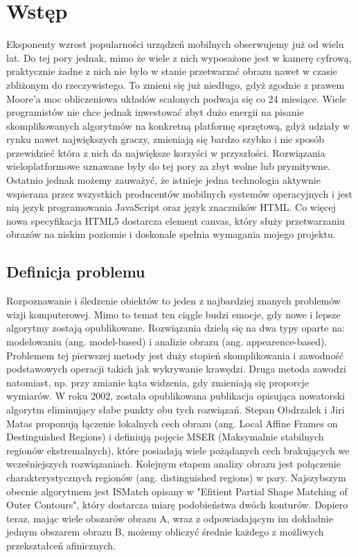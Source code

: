 \chapter{Wstęp}

Eksponenty wzrost popularności urządzeń mobilnych obserwujemy już od wielu lat.
Do tej pory jednak, mimo że wiele z nich wyposażone jest w kamerę cyfrową,
praktycznie żadne z nich nie było w stanie przetwarzać obrazu nawet w czasie
zbliżonym do rzeczywistego. To zmieni się już niedługo, gdyż zgodnie z prawem
Moore'a moc obliczeniowa układów scalonych podwaja się co 24 miesiące.  Wiele
programistów nie chce jednak inwestować zbyt dużo energii na pisanie
skomplikowanych algorytmów na konkretną platformę sprzętową, gdyż udziały w
rynku nawet największych graczy, zmieniają się bardzo szybko i nie sposób
przewidzieć która z nich da największe korzyści w przyszłości. Rozwiązania
wieloplatformowe uznawane były do tej pory za zbyt wolne lub prymitywne.
Ostatnio jednak możemy zauważyć, że istnieje jedna technologia aktywnie
wspierana przez wszystkich producentów mobilnych systemów operacyjnych i jest
nią język programowania JavaScript oraz język znaczników HTML. Co więcej nowa
specyfikacja HTML5 dostarcza element canvas, który służy przetwarzaniu obrazów
na niskim poziomie i doskonale spełnia wymagania mojego projektu.

\section{Definicja problemu}

Rozpoznawanie i śledzenie obiektów to jeden z najbardziej znanych problemów
wizji komputerowej. Mimo to temat ten ciągle budzi emocje, gdy nowe i lepsze
algorytmy zostają opublikowane. Rozwiązania dzielą się na dwa typy oparte na:
modelowaniu (ang. model-based) i analizie obrazu (ang. appearence-based).
Problemem tej pierwszej metody jest duży stopień skomplikowania i zawodność
podstawowych operacji takich jak wykrywanie krawędzi. Druga metoda zawodzi
natomiast, np.  przy zmianie kąta widzenia, gdy zmieniają się proporcje
wymiarów.  W roku 2002, została opublikowana publikacja opisująca nowatorski
algorytm eliminujący słabe punkty obu tych rozwiązań. Stepan Obdrzalek i Jiri
Matas proponują łączenie lokalnych cech obrazu (ang. Local Affine Frames on
Destinguished Regions) i definiują pojęcie MSER (Maksymalnie stabilnych
regionów ekstremalnych), które posiadają wiele pożądanych cech brakujących we
wcześniejszych rozwiązaniach.  Kolejnym etapem analizy obrazu jest połączenie
charakterystycznych regionów (ang. distinguished regions) w pary. Najszybszym
obecnie algorytmem jest ISMatch opisany w "Efitient Partial Shape Matching of
Outer Contours", który dostarcza miarę podobieństwa dwóch konturów. Dopiero
teraz, mając wiele obszarów obrazu A, wraz z odpowiadającym im dokładnie jednym
obszarem obrazu B, możemy obliczyć średnie każdego z możliwych przekształceń
afinicznych.

